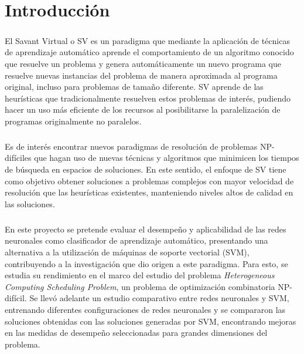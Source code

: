 \chapter{Introducción} \label{section-introduccion}

\paragraph{} El Savant Virtual o SV es un paradigma que mediante la aplicación de técnicas de aprendizaje automático aprende el comportamiento de un algoritmo conocido que resuelve un problema y genera automáticamente un nuevo programa que resuelve nuevas instancias del problema de manera aproximada al programa original, incluso para problemas de tamaño diferente.
SV aprende de las heurísticas que tradicionalmente resuelven estos problemas de interés, pudiendo hacer un uso más eficiente de los recursos al posibilitarse la paralelización de programas originalmente no paralelos.

\paragraph{} Es de interés encontrar nuevos paradigmas de resolución de problemas NP-difíciles que hagan uso de nuevas técnicas y algoritmos que minimicen los tiempos de búsqueda en espacios de soluciones.
En este sentido, el enfoque de SV tiene como objetivo obtener soluciones a problemas complejos con mayor velocidad de resolución que las heurísticas existentes, manteniendo niveles altos de calidad en las soluciones. 

\paragraph{} En este proyecto se pretende evaluar el desempeño y aplicabilidad de las redes neuronales como clasificador de aprendizaje automático, presentando una alternativa a la utilización de máquinas de soporte vectorial (SVM), contribuyendo a la investigación que dio origen a este paradigma.
Para esto, se estudia su rendimiento en el marco del estudio del problema \textit{Heterogeneous Computing Scheduling Problem}, un problema de optimización combinatoria NP-difícil.
Se llevó adelante un estudio comparativo entre redes neuronales y SVM, entrenando diferentes configuraciones de redes neuronales y se compararon las soluciones obtenidas con las soluciones generadas por SVM, encontrando mejoras en las medidas de desempeño seleccionadas para grandes dimensiones del problema.


